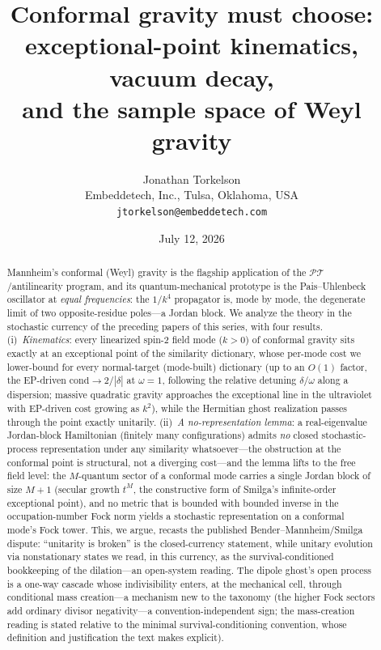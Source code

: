 \documentclass[11pt]{article}
\title{Conformal gravity must choose:\\
exceptional-point kinematics, vacuum decay,\\
and the sample space of Weyl gravity}
\author{Jonathan Torkelson\\[2pt]
\small Embeddetech, Inc., Tulsa, Oklahoma, USA\\
\small\texttt{jtorkelson@embeddetech.com}}
\date{July 12, 2026}
\theoremstyle{definition}
\theoremstyle{remark}
\newcommand{\PT}{\mathcal{PT}}
\begin{document}
\maketitle

\begin{abstract}
Mannheim's conformal (Weyl) gravity is the flagship application of
the $\PT$/antilinearity program, and its quantum-mechanical prototype
is the Pais--Uhlenbeck oscillator at \emph{equal frequencies}: the
$1/k^{4}$ propagator is, mode by mode, the degenerate limit of two
opposite-residue poles---a Jordan block. We analyze the theory in the
stochastic currency of the preceding papers of this series, with four
results. (i)~\emph{Kinematics}: every linearized spin-2 field mode ($k>0$) of
conformal
gravity
sits exactly at an exceptional point of the similarity dictionary,
whose per-mode cost we lower-bound for every normal-target (mode-built) dictionary (up to an $O(1)$ factor, the EP-driven $\mathrm{cond}\to2/|\delta|$ at $\omega=1$, following the relative
detuning $\delta/\omega$ along a dispersion; massive quadratic gravity approaches the exceptional line
in the ultraviolet with EP-driven cost growing as $k^{2}$), while the
Hermitian ghost realization passes through the point exactly
unitarily. (ii)~\emph{A no-representation lemma}: a real-eigenvalue
Jordan-block
Hamiltonian (finitely many configurations) admits \emph{no} closed stochastic-process representation
under any similarity whatsoever---the obstruction at the conformal
point is structural, not a diverging cost---and the lemma lifts to
the free field level: the $M$-quantum sector of a conformal mode carries a
single Jordan block of size $M{+}1$ (secular growth $t^{M}$, the
constructive form of Smilga's infinite-order exceptional point), and
no metric that is bounded with bounded inverse in the
occupation-number Fock norm yields a stochastic
representation on a conformal mode's Fock
tower. This, we argue, recasts the
published Bender--Mannheim/Smilga dispute: ``unitarity is broken''
is the closed-currency statement, while unitary evolution via
nonstationary states we read, in this currency, as the survival-conditioned
bookkeeping of the dilation---an open-system reading. The dipole
ghost's open process is a one-way cascade whose indivisibility enters, at the
mechanical cell, through conditional mass creation---a mechanism new to the
taxonomy (the higher Fock sectors add ordinary divisor negativity---a
convention-independent sign; the mass-creation reading is stated
relative to the minimal survival-conditioning convention,
whose definition and justification the text makes explicit).

\end{abstract}
\end{document}
